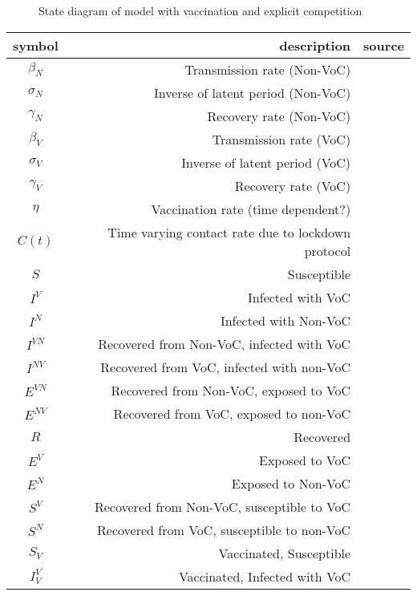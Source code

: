 \documentclass{article}
\begin{document}
\begin{figure}[h!]
    \centering
    
\caption{State diagram of model with vaccination and explicit competition}
\end{figure}

\begin{table}[h!]
    \begin{center}
    \begin{tabular}{c|r|c}
        symbol  & description & source \\
        \hline
        \hline
        $\beta_N$ & Transmission rate (Non-VoC) & \\
        $\sigma_N$ & Inverse of latent period (Non-VoC) & \\
        $\gamma_N$ & Recovery rate (Non-VoC) & \\
        $\beta_V$ &  Transmission rate (VoC) & \\
        $\sigma_V$ & Inverse of latent period (VoC) & \\
        $\gamma_V$ & Recovery rate (VoC)  & \\
        $\eta$ & Vaccination rate (time dependent?) & \\
        $C(t)$ & Time varying contact rate due to lockdown protocol & \\
        \hline
        $S$ & Susceptible & \\
        $I^V$ & Infected with VoC & \\
        $I^N$ & Infected with Non-VoC & \\
        $I^{VN}$ & Recovered from Non-VoC, infected with VoC & \\
        $I^{NV}$ & Recovered from VoC, infected with non-VoC & \\
        $E^{VN}$ & Recovered from Non-VoC, exposed to VoC & \\
        $E^{NV}$ & Recovered from VoC, exposed to non-VoC & \\
        $R$ & Recovered & \\
        $E^V$ & Exposed to VoC & \\
        $E^N$ & Exposed to Non-VoC & \\
        $S^V$ & Recovered from Non-VoC, susceptible to VoC  & \\
        $S^N$ & Recovered from VoC, susceptible to non-VoC  & \\
        \hline
        $S_V$ & Vaccinated, Susceptible & \\
        $I^V_V$ & Vaccinated, Infected with VoC & \\

\end{tabular}
\end{center}
\end{table}
\end{document}
